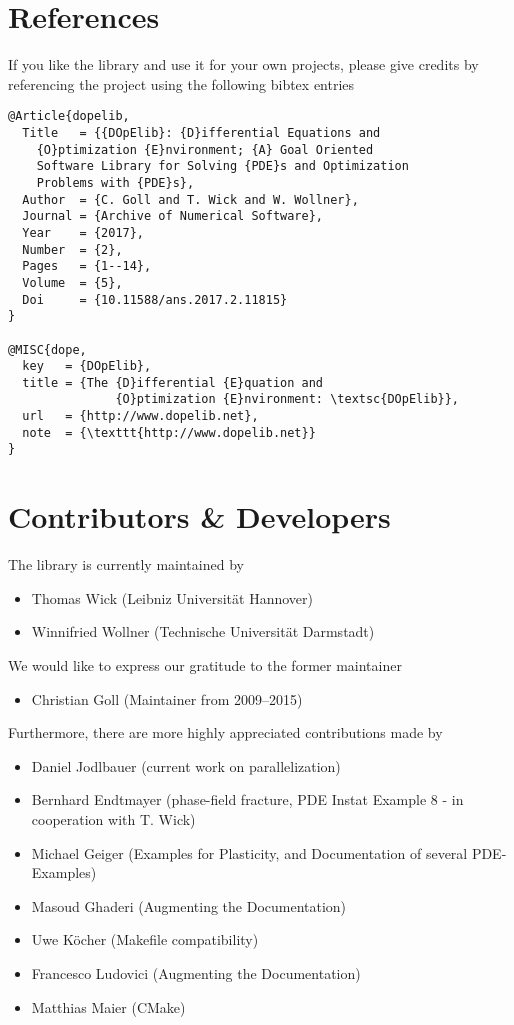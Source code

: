 \newpage
\section{References}
If you like the library and use it for your own projects, please give credits by 
referencing the project \dope{} using the following bibtex entries \cite{dope,dopelib}

\begin{lstlisting}
@Article{dopelib,
  Title   = {{DOpElib}: {D}ifferential Equations and 
    {O}ptimization {E}nvironment; {A} Goal Oriented 
    Software Library for Solving {PDE}s and Optimization 
    Problems with {PDE}s},
  Author  = {C. Goll and T. Wick and W. Wollner},
  Journal = {Archive of Numerical Software},
  Year    = {2017},
  Number  = {2},
  Pages   = {1--14},
  Volume  = {5},
  Doi     = {10.11588/ans.2017.2.11815}
}

@MISC{dope,
  key   = {DOpElib},
  title = {The {D}ifferential {E}quation and 
               {O}ptimization {E}nvironment: \textsc{DOpElib}},
  url   = {http://www.dopelib.net},
  note  = {\texttt{http://www.dopelib.net}}
}
\end{lstlisting}


\section{Contributors \& Developers}
\label{sec:contrib}
The library is currently maintained by 
\begin{itemize}
  \item Thomas Wick (Leibniz Universit\"at Hannover)
  \item Winnifried Wollner (Technische Universität Darmstadt)
\end{itemize}

We would like to express our gratitude to the former maintainer
\begin{itemize}
\item Christian Goll (Maintainer from 2009--2015)
\end{itemize}

Furthermore, there are more highly appreciated contributions
made by %
\begin{itemize}
  \item Daniel Jodlbauer (current work on parallelization)
  \item Bernhard Endtmayer (phase-field fracture, PDE Instat Example 8 - in cooperation with T. Wick)
  \item Michael Geiger (Examples for Plasticity, and Documentation of several PDE-Examples)
  \item Masoud Ghaderi (Augmenting the Documentation)
  \item Uwe K{\"o}cher (Makefile compatibility)
  \item Francesco Ludovici (Augmenting the Documentation)
  \item Matthias Maier (CMake)
\end{itemize}


